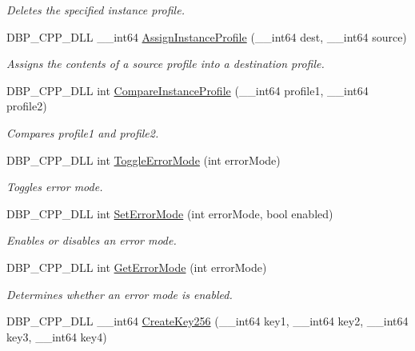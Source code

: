 \begin{DoxyCompactItemize}
\begin{DoxyCompactList}\small\item\em Deletes the specified instance profile. \item\end{DoxyCompactList}\item 
DBP\_\-CPP\_\-DLL \_\-\_\-int64 \hyperlink{namespacemn_a46ad175039e272f22babeee09229fc25}{AssignInstanceProfile} (\_\-\_\-int64 dest, \_\-\_\-int64 source)
\begin{DoxyCompactList}\small\item\em Assigns the contents of a source profile into a destination profile. \item\end{DoxyCompactList}\item 
DBP\_\-CPP\_\-DLL int \hyperlink{namespacemn_a63ef4ffbab0e24d8c68058b43dcce3c3}{CompareInstanceProfile} (\_\-\_\-int64 profile1, \_\-\_\-int64 profile2)
\begin{DoxyCompactList}\small\item\em Compares {\itshape profile1\/} and {\itshape profile2\/}. \item\end{DoxyCompactList}\item 
DBP\_\-CPP\_\-DLL int \hyperlink{namespacemn_a7dbb56094130ab288e1379defacb3f90}{ToggleErrorMode} (int errorMode)
\begin{DoxyCompactList}\small\item\em Toggles error mode. \item\end{DoxyCompactList}\item 
DBP\_\-CPP\_\-DLL int \hyperlink{namespacemn_a6e2a2ce91d0eb804d0ee01a68e5f9ccc}{SetErrorMode} (int errorMode, bool enabled)
\begin{DoxyCompactList}\small\item\em Enables or disables an error mode. \item\end{DoxyCompactList}\item 
DBP\_\-CPP\_\-DLL int \hyperlink{namespacemn_a62c409059881908699a72a3722eacfbe}{GetErrorMode} (int errorMode)
\begin{DoxyCompactList}\small\item\em Determines whether an error mode is enabled. \item\end{DoxyCompactList}\item 
DBP\_\-CPP\_\-DLL \_\-\_\-int64 \hyperlink{namespacemn_a820eed66d32aac0dff3130edfe8c2fc5}{CreateKey256} (\_\-\_\-int64 key1, \_\-\_\-int64 key2, \_\-\_\-int64 key3, \_\-\_\-int64 key4)

\end{DoxyCompactItemize}
